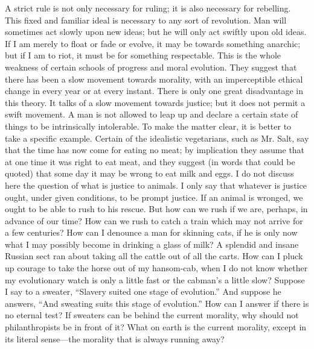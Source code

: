 \documentclass{book}
\begin{document}
A strict rule is not only necessary for ruling; it is also necessary for rebelling. This fixed and familiar ideal is necessary to any sort of revolution. Man will sometimes act slowly upon new ideas; but he will only act swiftly upon old ideas. If I am merely to float or fade or evolve, it may be towards something anarchic; but if I am to riot, it must be for something respectable. This is the whole weakness of certain schools of progress and moral evolution. They suggest that there has been a slow movement towards morality, with an imperceptible ethical change in every year or at every instant. There is only one great disadvantage in this theory. It talks of a slow movement towards justice; but it does not permit a swift movement. A man is not allowed to leap up and declare a certain state of things to be intrinsically intolerable. To make the matter clear, it is better to take a specific example. Certain of the idealistic vegetarians, such as Mr. Salt, say that the time has now come for eating no meat; by implication they assume that at one time it was right to eat meat, and they suggest (in words that could be quoted) that some day it may be wrong to eat milk and eggs. I do not discuss here the question of what is justice to animals. I only say that whatever is justice ought, under given conditions, to be prompt justice. If an animal is wronged, we ought to be able to rush to his rescue. But how can we rush if we are, perhaps, in advance of our time? How can we rush to catch a train which may not arrive for a few centuries? How can I denounce a man for skinning cats, if he is only now what I may possibly become in drinking a glass of milk? A splendid and insane Russian sect ran about taking all the cattle out of all the carts. How can I pluck up courage to take the horse out of my hansom-cab, when I do not know whether my evolutionary watch is only a little fast or the cabman’s a little slow? Suppose I say to a sweater, “Slavery suited one stage of evolution.” And suppose he answers, “And sweating suits this stage of evolution.” How can I answer if there is no eternal test? If sweaters can be behind the current morality, why should not philanthropists be in front of it? What on earth is the current morality, except in its literal sense—the morality that is always running away?
\end{document}
